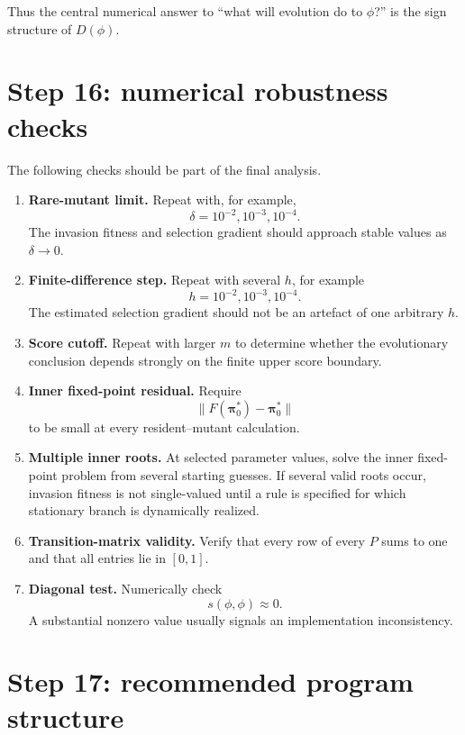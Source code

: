 \documentclass[11pt]{article}
\begin{document}
Thus the central numerical answer to ``what will evolution do to $\phi$?'' is the sign structure of $D(\phi)$.

\section{Step 16: numerical robustness checks}

The following checks should be part of the final analysis.

\begin{enumerate}[label=\arabic*.]
\item \textbf{Rare-mutant limit.} Repeat with, for example,
\[
\delta=10^{-2},10^{-3},10^{-4}.
\]
The invasion fitness and selection gradient should approach stable values as $\delta\to0$.

\item \textbf{Finite-difference step.} Repeat with several $h$, for example
\[
h=10^{-2},10^{-3},10^{-4}.
\]
The estimated selection gradient should not be an artefact of one arbitrary $h$.

\item \textbf{Score cutoff.} Repeat with larger $m$ to determine whether the evolutionary conclusion depends strongly on the finite upper score boundary.

\item \textbf{Inner fixed-point residual.} Require
\[
\|F(\bm{\pi}_0^*)-\bm{\pi}_0^*\|
\]
to be small at every resident--mutant calculation.

\item \textbf{Multiple inner roots.} At selected parameter values, solve the inner fixed-point problem from several starting guesses. If several valid roots occur, invasion fitness is not single-valued until a rule is specified for which stationary branch is dynamically realized.

\item \textbf{Transition-matrix validity.} Verify that every row of every $P$ sums to one and that all entries lie in $[0,1]$.

\item \textbf{Diagonal test.} Numerically check
\[
s(\phi,\phi)\approx0.
\]
A substantial nonzero value usually signals an implementation inconsistency.
\end{enumerate}

\section{Step 17: recommended program structure}
\end{document}
